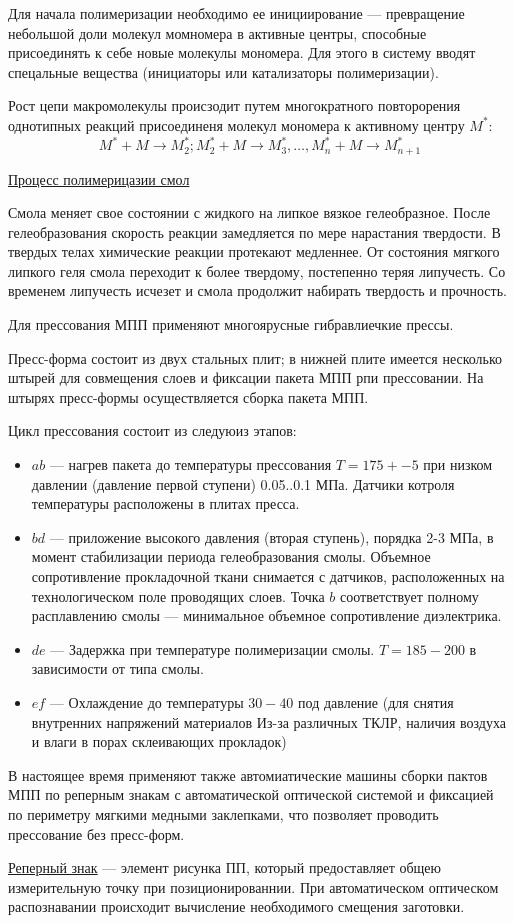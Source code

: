 \documentclass{article}
\begin{document}
Для начала полимеризации необходимо ее инициирование --- превращение небольшой доли молекул момномера в активные центры, способные присоединять к себе новые молекулы мономера. Для этого в систему вводят спецальные вещества (инициаторы или катализаторы полимеризации).

Рост цепи макромолекулы происзодит путем многократного повторорения однотипных реакций присоединеня молекул мономера к активному центру $M^*$:
$$
M^* + M \to M_2^*; M_2^* + M \to M_3^*, \dots , M_n^* + M \to M_{n+1}^*
$$

\underline{Процесс полимерицазии смол} 

Смола меняет свое состоянии с жидкого на липкое вязкое гелеобразное. После гелеобразования скорость реакции замедляется по мере нарастания твердости. В твердых телах химические реакции протекают медленнее. От состояния мягкого липкого геля смола переходит к более твердому, постепенно теряя липучесть. Со временем липучесть исчезет и смола продолжит набирать твердость и прочность.

Для прессования МПП применяют многоярусные гибравлиечкие прессы.

Пресс-форма состоит из двух стальных плит; в нижней плите имеется несколько штырей для совмещения слоев и фиксации пакета МПП рпи прессовании. На штырях пресс-формы осуществляется сборка пакета МПП.

Цикл прессования состоит из следуюиз этапов:

\begin{itemize}
	\item $ab$ --- нагрев пакета до температуры прессования $T = 175 +- 5$ при низком давлении (давление первой ступени) 0.05..0.1 МПа. Датчики котроля температуры расположены в плитах пресса.
	\item $bd$ --- приложение высокого давления (вторая ступень), порядка 2-3 МПа, в момент стабилизации периода гелеобразования смолы. Объемное сопротивление прокладочной ткани снимается с датчиков, расположенных на технологическом поле проводящих слоев. Точка $b$ соответствует полному расплавлению смолы --- минимальное объемное сопротивление диэлектрика.
	\item $de$ --- Задержка при температуре полимеризации смолы. $T = 185-200$ в зависимости от типа смолы.
	\item $ef$ --- Охлаждение до температуры $30-40$ под давление (для снятия внутренних напряжений материалов Из-за различных ТКЛР, наличия воздуха и влаги в порах склеивающих прокладок)
\end{itemize}

В настоящее время применяют также автомиатические машины сборки пактов МПП по реперным знакам с автоматической оптической системой и фиксацией по периметру мягкими медными заклепками, что позволяет проводить прессование без пресс-форм.

\underline{Реперный знак}  --- элемент рисунка ПП, который предоставляет общею измерительную точку при позиционированнии. При автоматическом оптическом распознавании происходит вычисление необходимого смещения заготовки.
\end{document}
